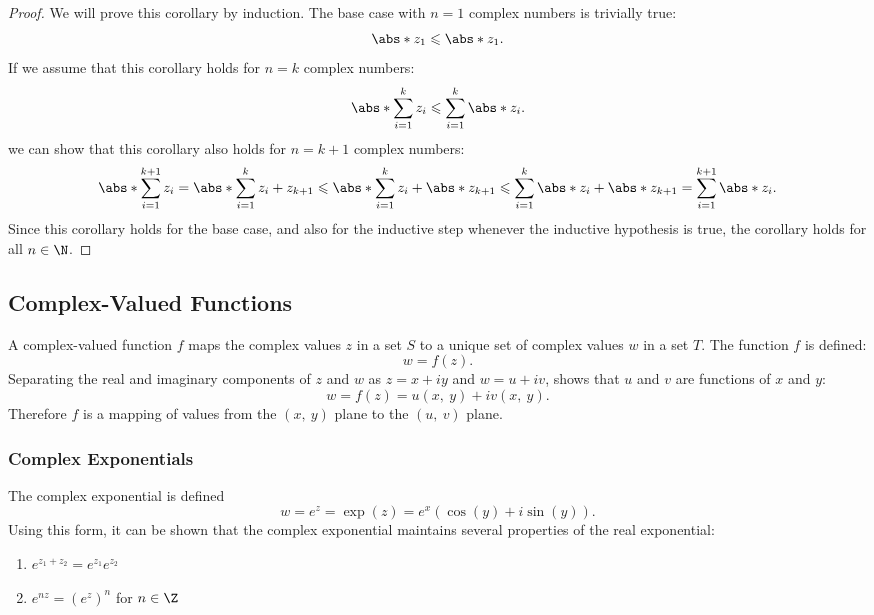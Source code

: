 \documentclass{article}
\begin{document}
\begin{proof}
    We will prove this corollary by induction. The base case with
    \(n = 1\) complex numbers is trivially true:
    \begin{equation*}
        \abs*{z_1} \leqslant \abs*{z_1}.
    \end{equation*}
    If we assume that this corollary holds for \(n = k\) complex
    numbers:
    \begin{equation*}
        \abs*{\sum_{i = 1}^k z_i} \leqslant \sum_{i = 1}^k \abs*{z_i}.
    \end{equation*}
    we can show that this corollary also holds for \(n = k + 1\) complex
    numbers:
    \begin{equation*}
        \abs*{\sum_{i = 1}^{k + 1} z_i} = \abs*{\sum_{i = 1}^k z_i + z_{k + 1}} \leqslant \abs*{\sum_{i = 1}^k z_i} + \abs*{z_{k + 1}} \leqslant \sum_{i = 1}^k \abs*{z_i} + \abs*{z_{k + 1}} = \sum_{i = 1}^{k + 1} \abs*{z_i}.
    \end{equation*}
    Since this corollary holds for the base case, and also for the
    inductive step whenever the inductive hypothesis is true, the
    corollary holds for all \(n \in \N\).
\end{proof}
\subsection{Complex-Valued Functions}
A complex-valued function \(f\) maps the complex values \(z\) in a set
\(S\) to a unique set of complex values \(w\) in a set \(T\). The
function \(f\) is defined:
\begin{equation*}
    w = f\left( z \right).
\end{equation*}
Separating the real and imaginary components of \(z\) and \(w\) as
\(z = x + i y\) and \(w = u + i v\), shows that \(u\) and \(v\) are
functions of \(x\) and \(y\):
\begin{equation*}
    w = f\left( z \right) = u\left( x,\: y \right) + i v\left( x,\: y \right).
\end{equation*}
Therefore \(f\) is a mapping of values from the
\(\left( x,\: y \right)\) plane to the \(\left( u,\: v \right)\) plane.
\subsubsection{Complex Exponentials}
The complex exponential is defined
\begin{equation*}
    w = e^z = \exp{\left( z \right)} = e^x \left( \cos{\left( y \right)} + i \sin{\left( y \right)} \right).
\end{equation*}
Using this form, it can be shown that the complex exponential maintains
several properties of the real exponential:
\begin{enumerate}
    \item \(e^{z_1 + z_2} = e^{z_1} e^{z_2}\)
    \item \(e^{n z} = \left( e^z \right)^n\) for \(n \in \Z\)
\end{enumerate}
\end{document}
